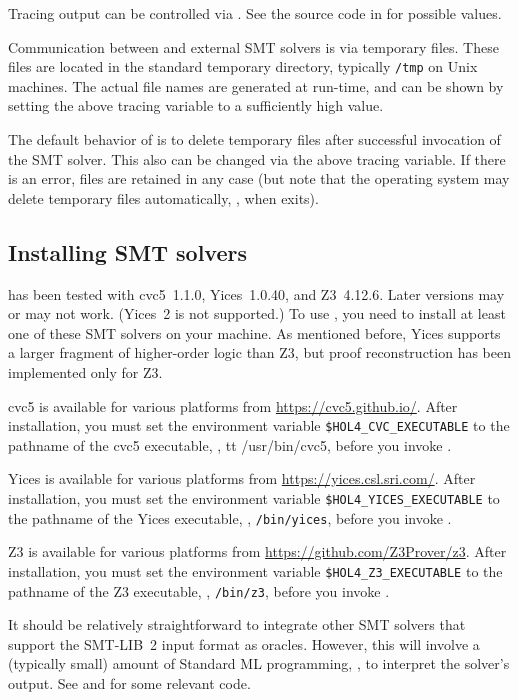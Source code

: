 Tracing output can be controlled via .  See the source code in  for
possible values.

Communication between \HOL{} and external SMT solvers is via temporary
files.  These files are located in the standard temporary directory,
typically {\tt /tmp} on Unix machines.  The actual file names are
generated at run-time, and can be shown by setting the above tracing
variable to a sufficiently high value.

The default behavior of  is to delete temporary files
after successful invocation of the SMT solver.  This also can be
changed via the above tracing variable.  If there is an error, files
are retained in any case (but note that the operating system may
delete temporary files automatically, \eg, when \HOL{} exits).

\subsection{Installing SMT solvers}

 has been tested with cvc5~1.1.0, Yices~1.0.40, and
Z3~4.12.6. Later versions may or may not work.  (Yices~2 is not
supported.)  To use , you need to install at least one
of these SMT solvers on your machine.  As mentioned before, Yices
supports a larger fragment of higher-order logic than Z3, but proof
reconstruction has been implemented only for Z3.

cvc5 is available for various platforms from
\url{https://cvc5.github.io/}. After installation, you must set the
environment variable {\tt \$HOL4\_CVC\_EXECUTABLE} to the pathname of
the cvc5 executable, \eg, {tt /usr/bin/cvc5}, before you invoke \HOL.

Yices is available for various platforms from
\url{https://yices.csl.sri.com/}.  After installation, you must set
the environment variable {\tt \$HOL4\_YICES\_EXECUTABLE} to the
pathname of the Yices executable, \eg, {\tt /bin/yices}, before you
invoke \HOL.

Z3 is available for various platforms from
\url{https://github.com/Z3Prover/z3}. After installation, you must set
the environment variable {\tt \$HOL4\_Z3\_EXECUTABLE} to the pathname
of the Z3 executable, \eg, {\tt /bin/z3}, before you invoke \HOL.

It should be relatively straightforward to integrate other SMT solvers
that support the SMT-LIB~2 input format as oracles.  However, this
will involve a (typically small) amount of Standard ML programming,
\eg, to interpret the solver's output.  See  and
 for some relevant code.

